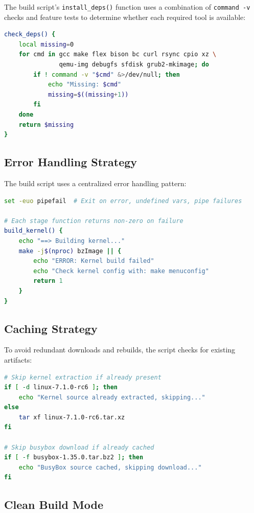 The build script's \texttt{install\_deps()} function uses a combination
of \texttt{command -v} checks and feature tests to determine whether each
required tool is available:

\begin{lstlisting}[language=bash]
check_deps() {
    local missing=0
    for cmd in gcc make flex bison bc curl rsync cpio xz \
               qemu-img debugfs sfdisk grub2-mkimage; do
        if ! command -v "$cmd" &>/dev/null; then
            echo "Missing: $cmd"
            missing=$((missing+1))
        fi
    done
    return $missing
}
\end{lstlisting}

\subsection{Error Handling Strategy}

The build script uses a centralized error handling pattern:

\begin{lstlisting}[language=bash]
set -euo pipefail  # Exit on error, undefined vars, pipe failures

# Each stage function returns non-zero on failure
build_kernel() {
    echo "==> Building kernel..."
    make -j$(nproc) bzImage || {
        echo "ERROR: Kernel build failed"
        echo "Check kernel config with: make menuconfig"
        return 1
    }
}
\end{lstlisting}

\subsection{Caching Strategy}

To avoid redundant downloads and rebuilds, the script checks for
existing artifacts:

\begin{lstlisting}[language=bash]
# Skip kernel extraction if already present
if [ -d linux-7.1.0-rc6 ]; then
    echo "Kernel source already extracted, skipping..."
else
    tar xf linux-7.1.0-rc6.tar.xz
fi

# Skip busybox download if already cached
if [ -f busybox-1.35.0.tar.bz2 ]; then
    echo "BusyBox source cached, skipping download..."
fi
\end{lstlisting}

\subsection{Clean Build Mode}

